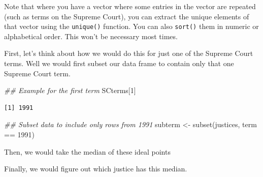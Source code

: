 \documentclass[
  letterpaper,
  DIV=11,
  numbers=noendperiod]{scrreprt}
\newenvironment{Shaded}{\begin{snugshade}}{\end{snugshade}}
\newcommand{\DecValTok}[1]{\textcolor[rgb]{0.68,0.00,0.00}{#1}}
\newcommand{\DocumentationTok}[1]{\textcolor[rgb]{0.37,0.37,0.37}{\textit{#1}}}
\newcommand{\FunctionTok}[1]{\textcolor[rgb]{0.28,0.35,0.67}{#1}}
\newcommand{\NormalTok}[1]{\textcolor[rgb]{0.00,0.23,0.31}{#1}}
\newcommand{\OtherTok}[1]{\textcolor[rgb]{0.00,0.23,0.31}{#1}}
\newcommand{\SpecialCharTok}[1]{\textcolor[rgb]{0.37,0.37,0.37}{#1}}
\begin{document}
Note that where you have a vector where some entries in the vector are
repeated (such as terms on the Supreme Court), you can extract the
unique elements of that vector using the \texttt{unique()} function. You
can also \texttt{sort()} them in numeric or alphabetical order. This
won't be necessary most times.

First, let's think about how we would do this for just one of the
Supreme Court terms. Well we would first subset our data frame to
contain only that one Supreme Court term.

\begin{Shaded}
\begin{Highlighting}[]
\DocumentationTok{\#\# Example for the first term}
\NormalTok{SCterms[}\DecValTok{1}\NormalTok{]}
\end{Highlighting}
\end{Shaded}

\begin{verbatim}
[1] 1991
\end{verbatim}

\begin{Shaded}
\begin{Highlighting}[]
\DocumentationTok{\#\# Subset data to include only rows from 1991}
\NormalTok{subterm }\OtherTok{\textless{}{-}} \FunctionTok{subset}\NormalTok{(justices, term }\SpecialCharTok{==} \DecValTok{1991}\NormalTok{)}
\end{Highlighting}
\end{Shaded}

Then, we would take the median of these ideal points

\begin{Shaded}
\end{Shaded}

Finally, we would figure out which justice has this median.

\begin{Shaded}
\end{Shaded}
\end{document}
